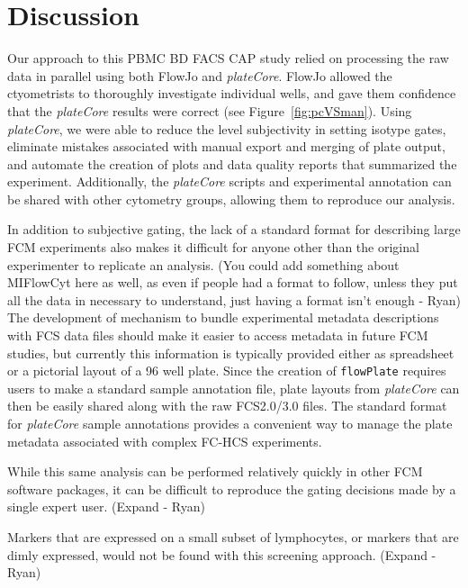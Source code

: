 \documentclass[12pt]{article}
\newcommand{\Robject}[1]{{\texttt{#1}}}
\newcommand{\Rpackage}[1]{{\textit{#1}}}
\begin{document}
\clearpage
\section*{Discussion}

Our approach to this PBMC BD FACS CAP study relied on processing the raw data
in parallel using both FlowJo and \Rpackage{plateCore}. FlowJo allowed the
ctyometrists to thoroughly investigate individual wells, and gave them
confidence that the \Rpackage{plateCore} results were correct (see
Figure~\ref{fig:pcVSman}). Using \Rpackage{plateCore}, we were able to reduce
the level subjectivity in setting isotype gates, eliminate mistakes associated
with manual export and merging of plate output, and automate the creation of
plots and data quality reports that summarized the experiment. Additionally,
the \Rpackage{plateCore} scripts and experimental annotation can be shared with
other cytometry groups, allowing them to reproduce our analysis.

In addition to subjective gating, the lack of a standard format for describing
large FCM experiments also makes it difficult for anyone other than the
original experimenter to replicate an analysis. (You could add something about
MIFlowCyt here as well, as even if people had a format to follow, unless they
put all the data in necessary to understand, just having a format isn't enough
- Ryan) The development of mechanism to bundle experimental metadata
descriptions with FCS data files should make it easier to access metadata in
future FCM studies, but currently this information is typically provided either
as spreadsheet or a pictorial layout of a 96 well plate. Since the creation of
\Robject{flowPlate} requires users to make a standard sample annotation file,
plate layouts from \Rpackage{plateCore} can then be easily shared along with
the raw FCS2.0/3.0 files. The standard format for \Rpackage{plateCore} sample
annotations provides a convenient way to manage the plate metadata associated
with complex FC-HCS experiments.

While this same analysis can be performed relatively quickly in 
other FCM software packages, it can be difficult to reproduce the gating
decisions made by a single expert user. (Expand - Ryan)

Markers that are expressed on a small subset of lymphocytes, or markers that
are dimly expressed, would not be found with this screening approach.
(Expand - Ryan)
\end{document}
